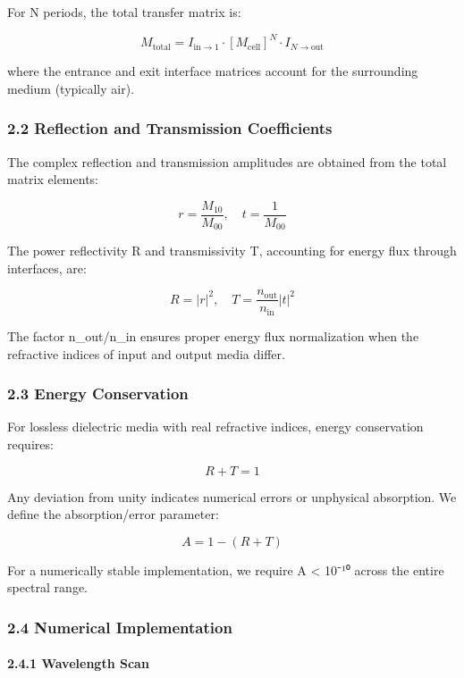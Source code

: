 \documentclass[
]{article}
\begin{document}
For N periods, the total transfer matrix is:

\[M_{\text{total}} = I_{\text{in}\to 1} \cdot [M_{\text{cell}}]^N \cdot I_{N\to\text{out}}\]

where the entrance and exit interface matrices account for the
surrounding medium (typically air).

\subsubsection{2.2 Reflection and Transmission
Coefficients}\label{reflection-and-transmission-coefficients}

The complex reflection and transmission amplitudes are obtained from the
total matrix elements:

\[r = \frac{M_{10}}{M_{00}}, \quad t = \frac{1}{M_{00}}\]

The power reflectivity R and transmissivity T, accounting for energy
flux through interfaces, are:

\[R = |r|^2, \quad T = \frac{n_{\text{out}}}{n_{\text{in}}}|t|^2\]

The factor n\_out/n\_in ensures proper energy flux normalization when
the refractive indices of input and output media differ.

\subsubsection{2.3 Energy Conservation}\label{energy-conservation}

For lossless dielectric media with real refractive indices, energy
conservation requires:

\[R + T = 1\]

Any deviation from unity indicates numerical errors or unphysical
absorption. We define the absorption/error parameter:

\[A = 1 - (R + T)\]

For a numerically stable implementation, we require \textbar A\textbar{}
\textless{} 10⁻¹⁰ across the entire spectral range.

\subsubsection{2.4 Numerical
Implementation}\label{numerical-implementation}

\paragraph{2.4.1 Wavelength Scan}\label{wavelength-scan}
\end{document}
